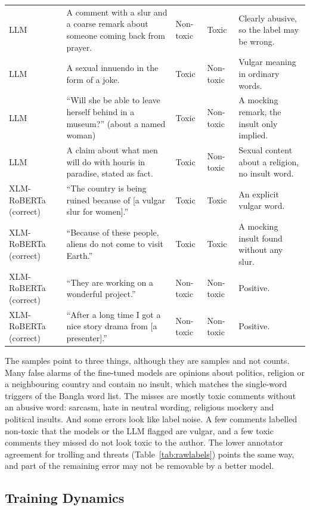 \begin{table}[H]
\begin{tabularx}{\textwidth}{>{\raggedright\arraybackslash}p{1.7cm} >{\raggedright\arraybackslash}X >{\raggedright\arraybackslash}p{1.2cm} >{\raggedright\arraybackslash}p{1.2cm} >{\raggedright\arraybackslash}X}
    LLM & A comment with a slur and a coarse remark about someone coming back from prayer. & Non-toxic & Toxic & Clearly abusive, so the label may be wrong. \\
    LLM & A sexual innuendo in the form of a joke. & Toxic & Non-toxic & Vulgar meaning in ordinary words. \\
    LLM & ``Will she be able to leave herself behind in a museum?'' (about a named woman) & Toxic & Non-toxic & A mocking remark, the insult only implied. \\
    LLM & A claim about what men will do with houris in paradise, stated as fact. & Toxic & Non-toxic & Sexual content about a religion, no insult word. \\
    \midrule
    XLM-RoBERTa (correct) & ``The country is being ruined because of [a vulgar slur for women].'' & Toxic & Toxic & An explicit vulgar word. \\
    XLM-RoBERTa (correct) & ``Because of these people, aliens do not come to visit Earth.'' & Toxic & Toxic & A mocking insult found without any slur. \\
    XLM-RoBERTa (correct) & ``They are working on a wonderful project.'' & Non-toxic & Non-toxic & Positive. \\
    XLM-RoBERTa (correct) & ``After a long time I got a nice story drama from [a presenter].'' & Non-toxic & Non-toxic & Positive. \\
    \bottomrule
  \end{tabularx}
\end{table}

The samples point to three things, although they are samples and not counts. Many false alarms of the fine-tuned models are opinions about politics, religion or a neighbouring country and contain no insult, which matches the single-word triggers of the Bangla word list. The misses are mostly toxic comments without an abusive word: sarcasm, hate in neutral wording, religious mockery and political insults. And some errors look like label noise. A few comments labelled non-toxic that the models or the LLM flagged are vulgar, and a few toxic comments they missed do not look toxic to the author. The lower annotator agreement for trolling and threats (Table~\ref{tab:rawlabels}) points the same way, and part of the remaining error may not be removable by a better model.

\subsection{Training Dynamics}

